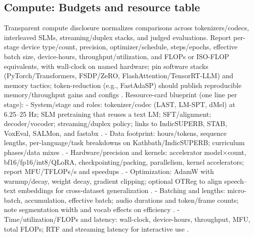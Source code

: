 \documentclass{article}
\begin{document}
\subsection{Compute: Budgets and resource table} \label{subsec:Compute: Budgets and resource table}
Transparent compute disclosure normalizes comparisons across tokenizers/codecs, interleaved SLMs, streaming/duplex stacks, and judged evaluations. Report per-stage device type/count, precision, optimizer/schedule, steps/epochs, effective batch size, device-hours, throughput/utilization, and FLOPs or ISO-FLOP equivalents, with wall-clock on named hardware; pin software stacks (PyTorch/Transformers, FSDP/ZeRO, FlashAttention/TensorRT-LLM) and memory tactics; token-reduction (e.g., FastAdaSP) should publish reproducible memory/throughput gains and configs \cite{maimon2025slammingtrainingspeechlanguagemodelonegp,chen2023reducingbarriersselfsupervisedlearninghu,lu2024fastadaspmultitaskadaptedefficientinfere}. Resource-card blueprint (one line per stage):
- System/stage and roles: tokenizer/codec (LAST, LM-SPT, dMel) at 6.25–25 Hz; SLM pretraining that reuses a text LM; SFT/alignment; decoder/vocoder; streaming/duplex policy; links to IndicSUPERB, STAB, VoxEval, SALMon, and fastabx \cite{turetzky2024lastlanguagemodelawarespeechtokenization,jo2025lmsptalignedsemanticdistillationspeechto,bai2025dmelspeechtokenizationmadesimple,vashishth2024stabspeechtokenizerassessmentbenchmark,cui2025voxevalbenchmarkingknowledgeunderstandin,maimon2025salmonsuiteacousticlanguagemodelevaluati,poli2025fastabxlibraryefficientcomputationabxdis}.
- Data footprint: hours/tokens, sequence lengths, per-language/task breakdowns on Kathbath/IndicSUPERB; curriculum phases/data mixes \cite{entry2025indicsuperbspeechprocessinguniversalperf}.
- Hardware/precision and kernels: accelerator model×count, bf16/fp16/int8/QLoRA, checkpointing/packing, parallelism, kernel accelerators; report MFU/TFLOPs/s and speedups \cite{maimon2025scalinganalysisinterleavedspeechtextlang,lu2024fastadaspmultitaskadaptedefficientinfere}.
- Optimization: AdamW with warmup/decay, weight decay, gradient clipping; optional OTReg to align speech–text embeddings for cross-dataset generalization \cite{xu2025optimaltransportregularizationspeechtext}.
- Batching and lengths: micro-batch, accumulation, effective batch; audio durations and token/frame counts; note segmentation width and vocab effects on efficiency \cite{turetzky2024lastlanguagemodelawarespeechtokenization}.
- Time/utilization/FLOPs and latency: wall-clock, device-hours, throughput, MFU, total FLOPs; RTF and streaming latency for interactive use \cite{maimon2025slammingtrainingspeechlanguagemodelonegp,entry2025indicsuperbspeechprocessinguniversalperf}.
\end{document}
